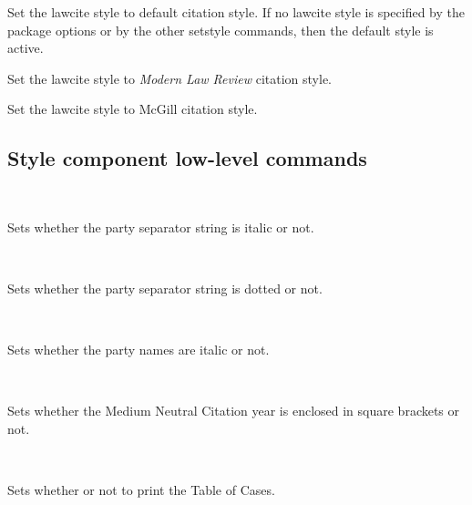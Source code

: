 Set the lawcite style to default citation style. If no lawcite style is specified by the package options or by the other setstyle commands, then the default style is active.
\bigskip
	

Set the lawcite style to \textit{Modern Law Review} citation style. 
\bigskip
	

Set the lawcite style to McGill citation style. 
\bigskip
	



\subsection{Style component low-level commands}




 \\

Sets whether the party separator string is italic or not.
\bigskip
	

 \\

Sets whether the party separator string is dotted or not.
\bigskip
	


 \\

Sets whether the party names are italic or not.
\bigskip
	




 \\

Sets whether the Medium Neutral Citation year is enclosed in square brackets or not.
\bigskip
	


 \\

Sets whether or not to print the Table of Cases.
\bigskip
	


 \\

